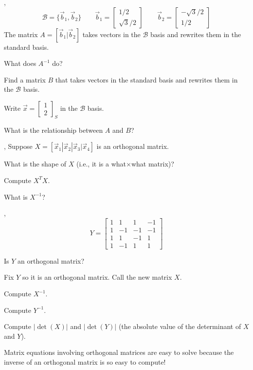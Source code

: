 \documentclass[letter]{article}
\newcommand{\mat}[1]{\begin{bmatrix}#1\end{bmatrix}}
\renewcommand{\emph}[1]{{\color{defcolor} \textbf{\textit{##1}}}}
\begin{document}
	\sep
	\[
		\mathcal B=\{\vec b_1,\vec b_2\}\qquad\vec b_1=\mat{1/2\\\sqrt{3}/2}
		\qquad \vec b_2=\mat{-\sqrt{3}/2\\1/2}
	\]
	The matrix $A=[\vec b_1|\vec b_2]$ takes vectors in the $\mathcal B$ basis
	and rewrites them in the standard basis.
	\begin{Enum}
		\item What does $A^{-1}$ do?
		\item Find a matrix $B$ that takes vectors in the standard basis
			and rewrites them in the $\mathcal B$ basis.
		\item Write $\vec x=\mat{1\\2}_S$ in the $\mathcal B$ basis.
		\item What is the relationship between $A$ and $B$?
	\end{Enum}


	\sep
	Suppose $X=[\vec x_1|\vec x_2|\vec x_3|\vec x_4]$ is an orthogonal matrix.
	\begin{Enum}
		\item What is the shape of $X$ (i.e., it is a what$\times$what matrix)?
		\item Compute $X^TX$.
		\item What is $X^{-1}$?
	\end{Enum}

	\sep
	\[
		Y=\mat{1&1&1&-1\\1&-1&-1&-1\\1&1&-1&1\\1&-1&1&1}
	\]
	\begin{Enum}
		\item Is $Y$ an orthogonal matrix?
		\item Fix $Y$ so it is an orthogonal matrix.  Call the new matrix $X$.
		\item Compute $X^{-1}$.
		\item Compute $Y^{-1}$.
		\item Compute $|\det(X)|$ and $|\det(Y)|$ (the absolute value of
			the determinant of $X$ and $Y$).
	\end{Enum}

	Matrix equations involving orthogonal matrices are easy to solve because the
	inverse of an orthogonal matrix is so easy to compute!
	
\end{document}
